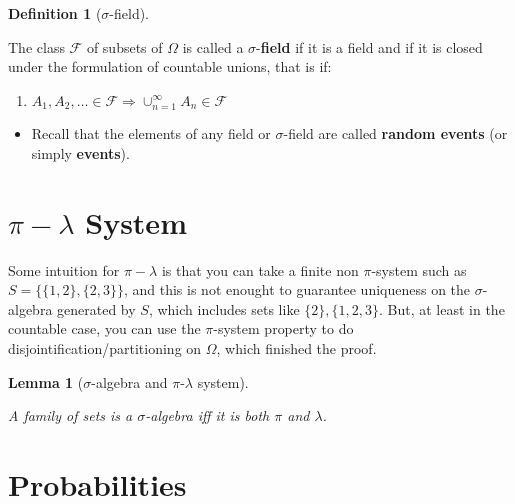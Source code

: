 \documentclass[
  13pt,
  letterpaper,
  DIV=11,
  numbers=noendperiod]{scrreprt}
\providecommand{\tightlist}{%
  \setlength{\itemsep}{0pt}\setlength{\parskip}{0pt}}\usepackage{longtable,booktabs,array}
\theoremstyle{definition}
\newtheorem{definition}{Definition}[chapter]
\theoremstyle{plain}
\newtheorem{lemma}{Lemma}[chapter]
\theoremstyle{definition}
\theoremstyle{plain}
\theoremstyle{plain}
\theoremstyle{definition}
\theoremstyle{remark}
\begin{document}
\begin{definition}[\(\sigma\)-field]\protect\hypertarget{def-sigmafield}{}\label{def-sigmafield}

The class \(\mathcal{F}\) of subsets of \(\Omega\) is called a
\(\sigma\)-\textbf{field} if it is a field and if it is closed under the
formulation of countable unions, that is if:

\begin{enumerate}
\def\labelenumi{\arabic{enumi}.}
\setcounter{enumi}{3}
\tightlist
\item
  \(A_1, A_2, \ldots \in \mathcal{F} \Longrightarrow \cup_{n=1}^{\infty} A_n \in \mathcal{F}\)
\end{enumerate}

\end{definition}

\begin{itemize}
\tightlist
\item
  Recall that the elements of any field or \(\sigma\)-field are called
  \textbf{random events} (or simply \textbf{events}).
\end{itemize}

\section{\texorpdfstring{\(\pi-\lambda\)
System}{\textbackslash pi-\textbackslash lambda System}}\label{pi-lambda-system}

Some intuition for \(\pi-\lambda\) is that you can take a finite non
\(\pi\)-system such as \(S = \{\{1,2\},\{2,3\}\}\), and this is not
enought to guarantee uniqueness on the \(\sigma\)-algebra generated by
\(S\), which includes sets like \(\{2\}, \{1,2,3\}\). But, at least in
the countable case, you can use the \(\pi\)-system property to do
disjointification/partitioning on \(\Omega\), which finished the proof.

\begin{lemma}[\(\sigma\)-algebra and \(\pi\)-\(\lambda\)
system]\protect\hypertarget{lem-pilambda}{}\label{lem-pilambda}

A family of sets is a \(\sigma\)-algebra iff it is both \(\pi\) and
\(\lambda\).

\end{lemma}

\section{Probabilities}\label{probabilities}
\end{document}

